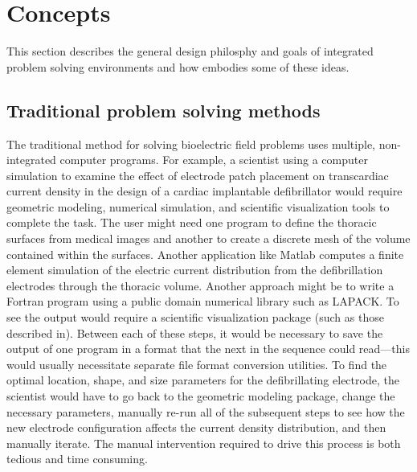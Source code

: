 %
%
%
%
%

\section{Concepts}
\label{sec:concepts} 

This section describes the general design philosphy and goals of
integrated problem solving environments  and how \BIOPSE{} embodies some of these ideas.

\subsection{Traditional problem solving methods}

The traditional method for solving bioelectric field problems uses
multiple, non-integrated computer programs.  For example, a scientist using
a computer simulation to examine the effect of electrode patch placement on
transcardiac current density in the design of a cardiac implantable
defibrillator\cite{CRJ:Sch95b} would require geometric modeling, numerical
simulation, and scientific visualization tools to complete the task.  The
user might need one program to define the thoracic surfaces from medical
images and another to create a discrete mesh of the volume contained within
the surfaces\cite{CRJ:Sch93b}.  Another application like Matlab computes a
finite element simulation of the electric current distribution from the
defibrillation electrodes through the thoracic volume\cite{RSM:And93}.
Another approach might be to write a Fortran program using a public domain
numerical library such as LAPACK\@ {}.  To see the output would
require a scientific visualization package (such as those described
in\cite{RSM:All91}).  Between each of these steps, it would be necessary to
save the output of one program in a format that the next in the sequence
could read---this would usually necessitate separate file format conversion
utilities.  To find the optimal location, shape, and size parameters for
the defibrillating electrode, the scientist would have to go back to the
geometric modeling package, change the necessary parameters, manually
re-run all of the subsequent steps to see how the new electrode
configuration affects the current density distribution, and then manually
iterate.  The manual intervention required to drive this process is both
tedious and time consuming.

